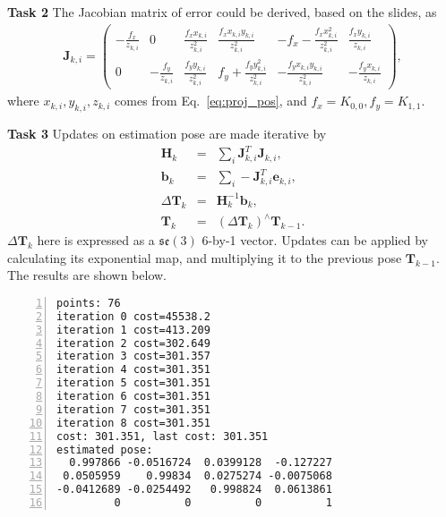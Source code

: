 \documentclass[12pt,a4paper]{article}
\newcommand{\vct}[1]{\boldsymbol{#1}}
\newcommand{\mtx}[1]{\mathbf{#1}}
\begin{document}
    \textsf{\textbf{Task 2}}
    The Jacobian matrix of error could be derived,
    based on the slides,
    as
    \begin{eqnarray}
      \mtx{J}_{k,i} = \begin{pmatrix}
        -\frac{f_x}{z_{k,i}} & 0 & \frac{f_x  x_{k,i}}{z_{k,i}^2} & \frac{f_x  x_{k,i} y_{k,i}}{z_{k,i}^2} & -f_x - \frac{f_x  x_{k,i}^2}{z_{k,i}^2} & \frac{f_x y_{k,i}}{z_{k,i}} \\
        0 & -\frac{f_y}{z_{k,i}} & \frac{f_y  y_{k,i}}{z_{k,i}^2} & f_y + \frac{f_y  y_{k,i}^2}{z_{k,i}^2} & -\frac{f_y x_{k,i} y_{k,i}}{z_{k,i}^2} & -\frac{f_y x_{k,i}}{z_{k,i}} 
      \end{pmatrix},
    \end{eqnarray}
    where $x_{k,i}, y_{k,i}, z_{k,i}$ comes from Eq.~\ref{eq:proj_pos},
    and $f_x = K_{0,0}, f_y = K_{1,1}$.

    \textsf{\textbf{Task 3}}
    Updates on estimation pose are made iterative by
    \begin{eqnarray}
      \mtx{H}_k &=& \sum_i \vct{J}_{k,i}^T \vct{J}_{k,i}, \nonumber\\
      \vct{b}_k &=& \sum_i - \vct{J}_{k,i}^T \vct{e}_{k,i} , \nonumber\\
      \Delta \mtx{T}_k &=& \mtx{H}_k^{-1} \vct{b}_k, \nonumber\\
      \mtx{T}_k  &=& (\Delta \mtx{T}_k)^{\wedge}  \mtx{T}_{k-1}.
    \end{eqnarray}
    $\Delta \mtx{T}_k$ here is expressed as a $\mathfrak{se}(3)$ 6-by-1 vector.
    Updates can be applied by calculating its exponential map, 
    and multiplying it to the previous pose $\mtx{T}_{k-1}$.
    The results are shown below.
    \begin{lstlisting}[frame=single,numbers=left]
points: 76
iteration 0 cost=45538.2
iteration 1 cost=413.209
iteration 2 cost=302.649
iteration 3 cost=301.357
iteration 4 cost=301.351
iteration 5 cost=301.351
iteration 6 cost=301.351
iteration 7 cost=301.351
iteration 8 cost=301.351
cost: 301.351, last cost: 301.351
estimated pose: 
  0.997866 -0.0516724  0.0399128  -0.127227
 0.0505959    0.99834  0.0275274 -0.0075068
-0.0412689 -0.0254492   0.998824  0.0613861
         0          0          0          1
    \end{lstlisting}

    
\end{document}
